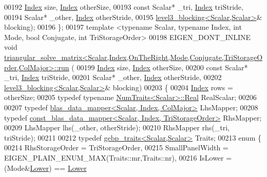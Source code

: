 \begin{DoxyCode}
00192     \hyperlink{namespace_eigen_a62e77e0933482dafde8fe197d9a2cfde}{Index} size, \hyperlink{namespace_eigen_a62e77e0933482dafde8fe197d9a2cfde}{Index} otherSize,
00193     \textcolor{keyword}{const} Scalar* \_tri, \hyperlink{namespace_eigen_a62e77e0933482dafde8fe197d9a2cfde}{Index} triStride,
00194     Scalar* \_other, \hyperlink{namespace_eigen_a62e77e0933482dafde8fe197d9a2cfde}{Index} otherStride,
00195     \hyperlink{class_eigen_1_1internal_1_1level3__blocking}{level3\_blocking<Scalar,Scalar>}& blocking);
00196 \};
00197 \textcolor{keyword}{template} <\textcolor{keyword}{typename} Scalar, \textcolor{keyword}{typename} Index, \textcolor{keywordtype}{int} Mode, \textcolor{keywordtype}{bool} Conjugate, \textcolor{keywordtype}{int} TriStorageOrder>
00198 EIGEN\_DONT\_INLINE \textcolor{keywordtype}{void} 
      \hyperlink{struct_eigen_1_1internal_1_1triangular__solve__matrix}{triangular\_solve\_matrix<Scalar,Index,OnTheRight,Mode,Conjugate,TriStorageOrder,ColMajor>::run}
      (
00199     \hyperlink{namespace_eigen_a62e77e0933482dafde8fe197d9a2cfde}{Index} size, \hyperlink{namespace_eigen_a62e77e0933482dafde8fe197d9a2cfde}{Index} otherSize,
00200     \textcolor{keyword}{const} Scalar* \_tri, \hyperlink{namespace_eigen_a62e77e0933482dafde8fe197d9a2cfde}{Index} triStride,
00201     Scalar* \_other, \hyperlink{namespace_eigen_a62e77e0933482dafde8fe197d9a2cfde}{Index} otherStride,
00202     \hyperlink{class_eigen_1_1internal_1_1level3__blocking}{level3\_blocking<Scalar,Scalar>}& blocking)
00203   \{
00204     \hyperlink{namespace_eigen_a62e77e0933482dafde8fe197d9a2cfde}{Index} rows = otherSize;
00205     \textcolor{keyword}{typedef} \textcolor{keyword}{typename} \hyperlink{group___core___module_struct_eigen_1_1_num_traits}{NumTraits<Scalar>::Real} RealScalar;
00206 
00207     \textcolor{keyword}{typedef} \hyperlink{class_eigen_1_1internal_1_1blas__data__mapper}{blas\_data\_mapper<Scalar, Index, ColMajor>} LhsMapper;
00208     \textcolor{keyword}{typedef} \hyperlink{class_eigen_1_1internal_1_1const__blas__data__mapper}{const\_blas\_data\_mapper<Scalar, Index, TriStorageOrder>}
       RhsMapper;
00209     LhsMapper lhs(\_other, otherStride);
00210     RhsMapper rhs(\_tri, triStride);
00211 
00212     \textcolor{keyword}{typedef} \hyperlink{class_eigen_1_1internal_1_1gebp__traits}{gebp\_traits<Scalar,Scalar>} Traits;
00213     \textcolor{keyword}{enum} \{
00214       RhsStorageOrder   = TriStorageOrder,
00215       SmallPanelWidth   = EIGEN\_PLAIN\_ENUM\_MAX(Traits::mr,Traits::nr),
00216       IsLower = (Mode&\hyperlink{group__enums_gga39e3366ff5554d731e7dc8bb642f83cda891792b8ed394f7607ab16dd716f60e6}{Lower}) == \hyperlink{group__enums_gga39e3366ff5554d731e7dc8bb642f83cda891792b8ed394f7607ab16dd716f60e6}{Lower}

\end{DoxyCode}
